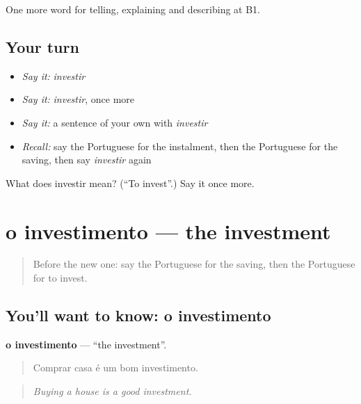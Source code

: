 \begin{grammarlens}[title={What you've built}]
One more word for telling, explaining and describing at B1.
\end{grammarlens}

\subsection*{Your turn}
\begin{itemize}
\raggedright
  \item \emph{Say it:} \emph{investir}
  \item \emph{Say it:} \emph{investir}, once more
  \item \emph{Say it:} a sentence of your own with \emph{investir}
  \item \emph{Recall:} say the Portuguese for the instalment, then the Portuguese for the saving, then say \emph{investir} again
\end{itemize}

\begin{tcolorbox}[breakable,colback=teal!4,colframe=teal!35!black,title={Before you move on}]
What does investir mean? (\textquotedblleft{}To invest\textquotedblright{}.) Say it once more.
\end{tcolorbox}
\section[o investimento]{o investimento — the investment}

\label{lesson:PT-C392-investimento}



\begin{quote}
Before the new one: say the Portuguese for the saving, then the Portuguese for to invest.
\end{quote}

\subsection*{You'll want to know: o investimento}
\textbf{o investimento} — \textquotedblleft{}the investment\textquotedblright{}.

\begin{quote}
Comprar casa é um bom investimento.
\end{quote}

\begin{quote}
\emph{Buying a house is a good investment.}
\end{quote}

